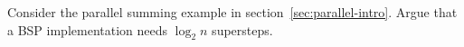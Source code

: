   Consider the parallel summing example in
  section~\ref{sec:parallel-intro}. Argue that a \ac{BSP}
  implementation needs $\log_2n$ supersteps.

